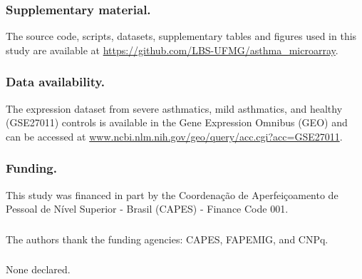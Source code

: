 \begin{credits}

  \subsubsection{Supplementary material.}

  The source code, scripts, datasets, supplementary tables and figures used in this study are available at \url{https://github.com/LBS-UFMG/asthma\_microarray}.

  \subsubsection{Data availability.}

  The expression dataset from severe asthmatics, mild asthmatics, and healthy (GSE27011) controls is available in the Gene Expression Omnibus (GEO) and can be accessed at \url{www.ncbi.nlm.nih.gov/geo/query/acc.cgi?acc=GSE27011}.

  \subsubsection{Funding.}

  This study was financed in part by the Coordenação de Aperfeiçoamento de Pessoal de Nível Superior - Brasil (CAPES) - Finance Code 001.

  \subsubsection{\ackname} %

  The authors thank the funding agencies: CAPES, FAPEMIG, and CNPq.

  \subsubsection{\discintname} %

  None declared.

\end{credits}